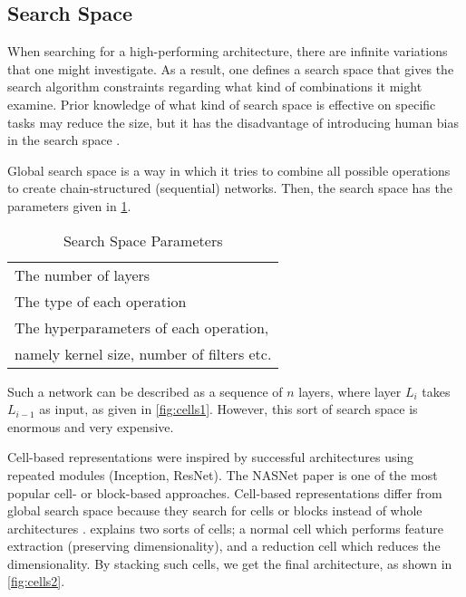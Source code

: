\subsection{Search Space}
When searching for a high-performing architecture, there are infinite variations that one might investigate. As a result, one defines a search space that gives the search algorithm constraints regarding what kind of combinations it might examine. Prior knowledge of what kind of search space is effective on specific tasks may reduce the size, but it has the disadvantage of introducing human bias in the search space \autocite{elsken2019neural}.  

Global search space is a way in which it tries to combine all possible operations to create chain-structured (sequential) networks. Then, the search space has the parameters given in \cref{tab:params}. 

\begin{table}[ht]
\caption{Search Space Parameters}
\centering
\begin{tabular}{|l}
The number of layers \\
\cellcolor{verylightgray}The type of each operation    \\
The hyperparameters of each operation, \\ namely kernel size, number of filters etc. \\
\end{tabular}
\label{tab:params}
\end{table}

Such a network can be described as a sequence of $n$ layers, where layer $L_i$ takes $L_{i-1}$ as input, as given in \cref{fig:cells1}. However, this sort of search space is enormous and very expensive. 

Cell-based representations were inspired by successful architectures using repeated modules (Inception, ResNet). The NASNet paper \autocite{DBLP:journals/corr/ZophVSL17} is one of the most popular cell- or block-based approaches. Cell-based representations differ from global search space because they search for cells or blocks instead of whole architectures \autocite{elsken2019neural}. \cite{DBLP:journals/corr/ZophVSL17} explains two sorts of cells; a normal cell which performs feature extraction (preserving dimensionality), and a reduction cell which reduces the dimensionality. By stacking such cells, we get the final architecture, as shown in \cref{fig:cells2}. 


